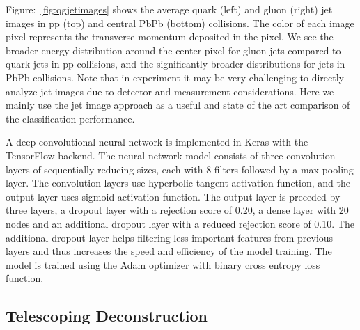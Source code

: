 \documentclass[notoc]{JHEP3}
\begin{document}
Figure:~\ref{fig:qgjetimages} shows the average quark (left) and gluon (right) jet images in pp (top) and central PbPb (bottom) collisions. The color of each image pixel represents the transverse momentum deposited in the pixel. We see the broader energy distribution around the center pixel for gluon jets compared to quark jets in pp collisions, and the significantly broader distributions for jets in PbPb collisions. Note that in experiment it may be very challenging to directly analyze jet images due to detector and measurement considerations. Here we mainly use the jet image approach as a useful and state of the art comparison of the classification performance.
	
A deep convolutional neural network is implemented in Keras with the TensorFlow backend. The neural network model consists of three convolution layers of sequentially reducing sizes, each with 8 filters followed by a max-pooling layer. The convolution layers use hyperbolic tangent activation function, and the output layer uses sigmoid activation function. The output layer is preceded by three layers, a dropout layer with a rejection score of 0.20, a dense layer with 20 nodes and an additional dropout layer with a reduced rejection score of 0.10. The additional dropout layer helps filtering less important features from previous layers and thus increases the speed and efficiency of the model training. The model is trained using the Adam optimizer with binary cross entropy loss function.
	
\subsection{Telescoping Deconstruction}
\label{sec:tjet}
\end{document}
